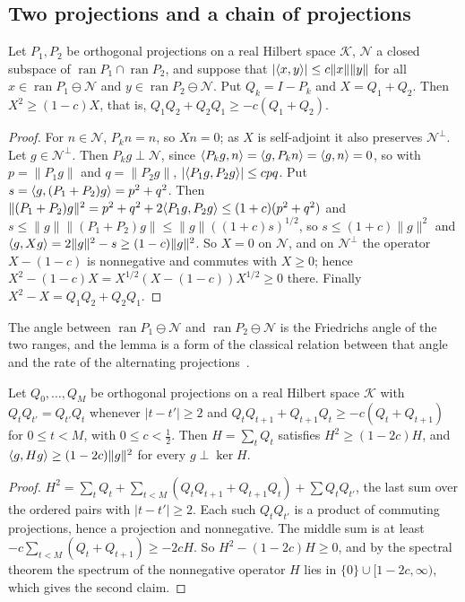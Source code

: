 \subsection{Two projections and a chain of projections}

\begin{lemma}\label{lem:friedrichs}
Let $P_1,P_2$ be orthogonal projections on a real Hilbert space $\mathcal K$,
$\mathcal N$ a closed subspace of $\operatorname{ran}P_1\cap
\operatorname{ran}P_2$, and suppose that $|\langle x,y\rangle|\le c\|x\|\|y\|$ for all
$x\in\operatorname{ran}P_1\ominus\mathcal N$ and $y\in\operatorname{ran}P_2
\ominus\mathcal N$. Put $Q_k=I-P_k$ and $X=Q_1+Q_2$. Then $X^2\ge(1-c)X$,
that is, $Q_1Q_2+Q_2Q_1\ge-c(Q_1+Q_2)$.
\end{lemma}

\begin{proof}
For $n\in\mathcal N$, $P_kn=n$, so $Xn=0$; as $X$ is self-adjoint it also
preserves $\mathcal N^\perp$. Let $g\in\mathcal N^\perp$. Then $P_kg\perp
\mathcal N$, since $\langle P_kg,n\rangle=\langle g,P_kn\rangle=\langle g,n\rangle=0$, so with $p=\|P_1g\|$
and $q=\|P_2g\|$, $|\langle P_1g,P_2g\rangle|\le cpq$. Put $s=\langle g,(P_1+P_2)g\rangle=
p^2+q^2$. Then $\|(P_1+P_2)g\|^2=p^2+q^2+2\langle P_1g,P_2g\rangle\le(1+c)(p^2+q^2)$
and $s\le\|g\|\|(P_1+P_2)g\|\le\|g\|((1+c)s)^{1/2}$, so $s\le(1+c)\|g\|^2$
and $\langle g,Xg\rangle=2\|g\|^2-s\ge(1-c)\|g\|^2$. So $X=0$ on $\mathcal N$, and on
$\mathcal N^\perp$ the operator $X-(1-c)$ is nonnegative and commutes with
$X\ge0$; hence $X^2-(1-c)X=X^{1/2}(X-(1-c))X^{1/2}\ge0$ there. Finally
$X^2-X=Q_1Q_2+Q_2Q_1$.
\end{proof}

The angle between $\operatorname{ran}P_1\ominus\mathcal N$ and
$\operatorname{ran}P_2\ominus\mathcal N$ is the Friedrichs angle of the two
ranges, and the lemma is a form of the classical relation between that angle
and the rate of the alternating projections~\cite{Deu01}.

\begin{lemma}\label{lem:chain}
Let $Q_0,\dots,Q_M$ be orthogonal projections on a real Hilbert space
$\mathcal K$ with $Q_tQ_{t'}=Q_{t'}Q_t$ whenever $|t-t'|\ge2$ and
$Q_tQ_{t+1}+Q_{t+1}Q_t\ge-c(Q_t+Q_{t+1})$ for $0\le t<M$, with $0\le c<
\frac12$. Then $H=\sum_tQ_t$ satisfies $H^2\ge(1-2c)H$, and $\langle g,Hg\rangle\ge
(1-2c)\|g\|^2$ for every $g\perp\ker H$.
\end{lemma}

\begin{proof}
$H^2=\sum_tQ_t+\sum_{t<M}(Q_tQ_{t+1}+Q_{t+1}Q_t)+\sum Q_tQ_{t'}$, the last
sum over the ordered pairs with $|t-t'|\ge2$. Each such $Q_tQ_{t'}$ is a
product of commuting projections, hence a projection and nonnegative. The
middle sum is at least $-c\sum_{t<M}(Q_t+Q_{t+1})\ge-2cH$. So $H^2-(1-2c)H
\ge0$, and by the spectral theorem the spectrum of the nonnegative operator
$H$ lies in $\{0\}\cup[1-2c,\infty)$, which gives the second claim.
\end{proof}

